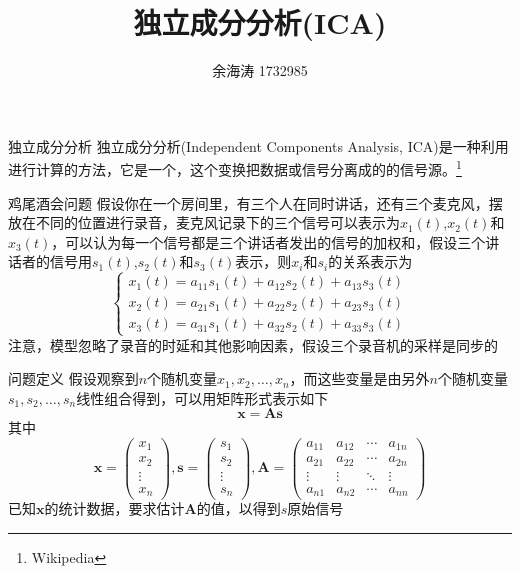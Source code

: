 \documentclass{beamer}
\newcommand{\hl}[1]{{\color{blue}{#1}}}
\begin{document}
\title{独立成分分析(ICA)}
\author{余海涛 1732985}
\frame{\titlepage}


\begin{frame}{独立成分分析}  
   独立成分分析(Independent Components Analysis, ICA)是一种利用\hl{统计原理}进行计算的方法，它是一个\hl{线性变换}，这个变换把数据或信号分离成\hl{统计独立}的\hl{非高斯}的信号源。\footnote{Wikipedia}
\end{frame}  

\begin{frame}{鸡尾酒会问题}
    假设你在一个房间里，有三个人在同时讲话，还有三个麦克风，摆放在不同的位置进行录音，麦克风记录下的三个信号可以表示为$x_1(t)$,$x_2(t)$和$x_3(t)$，可以认为每一个信号都是三个讲话者发出的信号的加权和，假设三个讲话者的信号用$s_1(t)$,$s_2(t)$和$s_3(t)$表示，则$x_i$和$s_i$的关系表示为
    \begin{equation}
    \left\{
    \begin{aligned}
    x_1(t)=a_{11}s_1(t)+a_{12}s_2(t)+a_{13}s_3(t) \\
    x_2(t)=a_{21}s_1(t)+a_{22}s_2(t)+a_{23}s_3(t) \\
    x_3(t)=a_{31}s_1(t)+a_{32}s_2(t)+a_{33}s_3(t)
    \end{aligned}
    \right.
    \end{equation}
    {\color{red}注意，模型忽略了录音的时延和其他影响因素，假设三个录音机的采样是同步的}
\end{frame}

\begin{frame}{问题定义}
    假设观察到$n$个随机变量$x_1,x_2,\ldots,x_n$，而这些变量是由另外$n$个随机变量$s_1,s_2,\ldots,s_n$线性组合得到，可以用矩阵形式表示如下
    \begin{equation}
    \mathbf{x}=\mathbf{As}
    \end{equation}
    其中
    \begin{equation}
    \mathbf{x}=\left(
    \begin{aligned}
    x_1\\
    x_2\\
    \vdots\\
    x_n
    \end{aligned}
    \right),
    \mathbf{s}=\left(
    \begin{aligned}
    s_1\\
    s_2\\
    \vdots\\
    s_n
    \end{aligned}
    \right),
    \mathbf{A}=\left(
    \begin{array}{cccc}
    a_{11} & a_{12} & \cdots & a_{1n} \\ 
    a_{21} & a_{22} & \cdots & a_{2n} \\ 
    \vdots & \vdots & \ddots & \vdots \\ 
    a_{n1} & a_{n2} & \cdots & a_{nn}
    \end{array} 
    \right)
    \end{equation}
    已知$\mathbf{x}$的统计数据，要求估计$\mathbf{A}$的值，以得到$s$原始信号
\end{frame}
\end{document}
